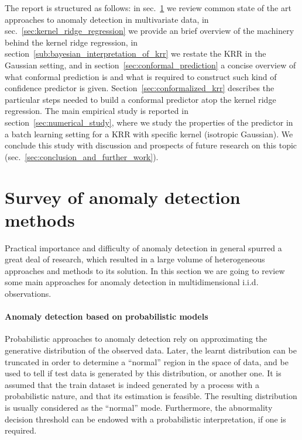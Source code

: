 \documentclass[a4paper,14pt]{extarticle}
\begin{document}
The report is structured as follows: in sec.~\ref{sec:survey} we review common state
of the art approaches to anomaly detection in multivariate data, in sec.~\ref{sec:kernel_ridge_regression}
we provide an brief overview of the machinery behind the kernel ridge regression, in
section~\ref{sub:bayesian_interpretation_of_krr} we restate the KRR in the Gaussian
setting, and in section~\ref{sec:conformal_prediction} a concise overview of what
conformal prediction is and what is required to construct such kind of confidence
predictor is given. Section~\ref{sec:conformalized_krr} describes the particular
steps needed to build a conformal predictor atop the kernel ridge regression.
The main empirical study is reported in section~\ref{sec:numerical_study}, where
we study the properties of the predictor in a batch learning setting for a KRR
with specific kernel (isotropic Gaussian). We conclude this study with discussion
and prospects of future research on this topic (sec.~\ref{sec:conclusion_and_further_work}).


\section{Survey of anomaly detection methods} %
\label{sec:survey}

Practical importance and difficulty of anomaly detection in general spurred a great
deal of research, which resulted in a large volume of heterogeneous approaches and
methods to its solution. In this section we are going to review some main approaches
for anomaly detection in multidimensional i.i.d. observations.

\paragraph{Anomaly detection based on probabilistic models} %
\label{par:anomaly_detection_based_on_probabilistic_models}

Probabilistic approaches to anomaly detection rely on approximating the generative
distribution of the observed data. Later, the learnt distribution can be truncated
in order to determine a ``normal'' region in the space of data, and be used to tell
if test data is generated by this distribution, or another one. It is assumed that
the train dataset is indeed generated by a process with a probabilistic nature, and
that its estimation is feasible. The resulting distribution is usually considered
as the ``normal'' mode. Furthermore, the abnormality decision threshold can be endowed
with a probabilistic interpretation, if one is required.
\end{document}

